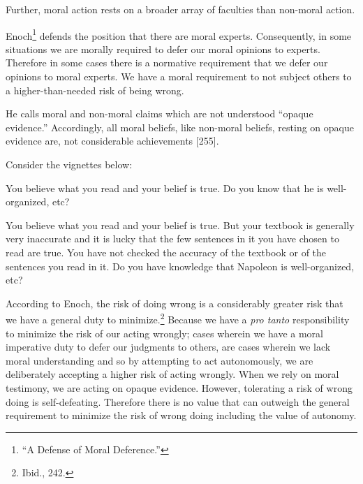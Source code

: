\documentclass[phdthesis,12pt,final]{wuthesis}
\theoremstyle{definition}
\theoremstyle{definition}
\theoremstyle{definition}
\theoremstyle{definition}
\theoremstyle{remark}
\begin{document}
Further, moral action rests on a broader array of faculties than non-moral action.

Enoch\footnote{{``A {Defense} of {Moral Deference}.''}} defends the position that there are moral experts. Consequently, in some situations we are morally required to defer our moral opinions to experts. Therefore in some cases there is a normative requirement that we defer our opinions to moral experts. We have a moral requirement to not subject others to a higher-than-needed risk of being wrong.

He calls moral and non-moral claims which are not understood ``opaque evidence.'' Accordingly, all moral beliefs, like non-moral beliefs, resting on opaque evidence are, not considerable achievements {[}255{]}.

Consider the vignettes below:

\begin{Shaded}
\begin{Highlighting}[]

\end{Highlighting}
\end{Shaded}

You believe what you read and your belief is true. Do you know that he is well-organized, etc?

\begin{Shaded}
\begin{Highlighting}[]

\end{Highlighting}
\end{Shaded}

You believe what you read and your belief is true. But your textbook is generally very inaccurate and it is lucky that the few sentences in it you have chosen to read are true. You have not checked the accuracy of the textbook or of the sentences you read in it. Do you have knowledge that Napoleon is well-organized, etc?

According to Enoch, the risk of doing wrong is a considerably greater risk that we have a general duty to minimize.\footnote{Ibid., 242.} Because we have a \emph{pro tanto} responsibility to minimize the risk of our acting wrongly; cases wherein we have a moral imperative duty to defer our judgments to others, are cases wherein we lack moral understanding and so by attempting to act autonomously, we are deliberately accepting a higher risk of acting wrongly. When we rely on moral testimony, we are acting on opaque evidence. However, tolerating a risk of wrong doing is self-defeating. Therefore there is no value that can outweigh the general requirement to minimize the risk of wrong doing including the value of autonomy.
\end{document}
